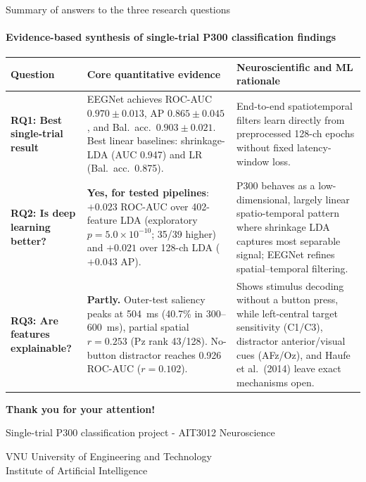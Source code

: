 \documentclass[10pt,aspectratio=169]{beamer}
\newcommand{\sectionindex}{01}
\begin{document}
\renewcommand{\sectionindex}{06}
\begin{frame}{Summary of answers to the three research questions}
  \framesubtitle{Evidence-based synthesis of single-trial P300 classification findings}
  \begin{center}
    \renewcommand{\arraystretch}{1.32}
    \scriptsize
    \begin{tabularx}{\linewidth}{l>{\raggedright\arraybackslash}X>{\raggedright\arraybackslash}p{46mm}}
      \toprule
      Question & Core quantitative evidence & Neuroscientific and ML rationale \\
      \midrule
      \textbf{RQ1: Best single-trial result} &
      EEGNet achieves ROC-AUC $0.970 \pm 0.013$, AP $0.865 \pm 0.045$, and Bal.\ acc.\ $0.903 \pm 0.021$. Best linear baselines: shrinkage-LDA (AUC 0.947) and LR (Bal.\ acc.\ 0.875). &
      End-to-end spatiotemporal filters learn directly from preprocessed 128-ch epochs without fixed latency-window loss. \\
      \midrule
      \textbf{RQ2: Is deep learning better?} &
      \textbf{Yes, for tested pipelines}: $+0.023$ ROC-AUC over 402-feature LDA (exploratory $p = 5.0 \times 10^{-10}$; 35/39 higher) and $+0.021$ over 128-ch LDA ($+0.043$ AP). &
      P300 behaves as a low-dimensional, largely linear spatio-temporal pattern where shrinkage LDA captures most separable signal; EEGNet refines spatial--temporal filtering. \\
      \midrule
      \textbf{RQ3: Are features explainable?} &
      \textbf{Partly.} Outer-test saliency peaks at 504~ms (40.7\% in 300--600~ms), partial spatial $r = 0.253$ (Pz rank 43/128). No-button distractor reaches 0.926 ROC-AUC ($r = 0.102$). &
      Shows stimulus decoding without a button press, while left-central target sensitivity (C1/C3), distractor anterior/visual cues (AFz/Oz), and Haufe et al.\ (2014) leave exact mechanisms open. \\
      \bottomrule
    \end{tabularx}
  \end{center}
\end{frame}

\begin{frame}
  \centering
  \vspace{12mm}
  {\color{Navy}\bfseries\fontsize{26}{30}\selectfont
  Thank you for your attention!\par}
  \vspace{7mm}
  {\color{TitleNavy}\fontsize{12}{15}\selectfont
  Single-trial P300 classification project - AIT3012 Neuroscience\par}
  \vspace{4mm}
  {\color{Muted}\small
  VNU University of Engineering and Technology\\
  Institute of Artificial Intelligence\par}
\end{frame}
\end{document}

